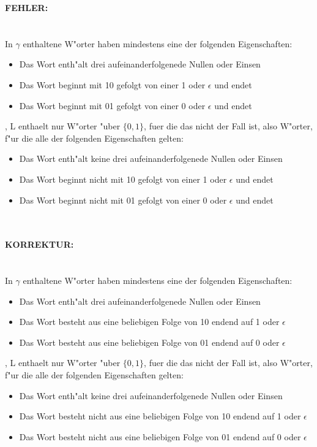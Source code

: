 \documentclass{article}
\newcommand{\gap}{\null\ \\ \\}
\newcommand{\eps}{\epsilon}
\newcommand{\task}[1]{\textbf{#1} \\ \gap}
\newcommand{\error}{\task{FEHLER:}}
\newcommand{\correction}{\task{KORREKTUR:}}
\begin{document}
\error
In $\gamma$ enthaltene W"orter haben mindestens eine der folgenden
Eigenschaften:\\
\begin{itemize}
    \item Das Wort enth"alt drei aufeinanderfolgenede Nullen oder Einsen
    \item Das Wort beginnt mit 10 gefolgt von einer 1 oder $\eps$ und endet
    \item Das Wort beginnt mit 01 gefolgt von einer 0 oder $\eps$ und endet
\end{itemize}
, L enthaelt nur W"orter "uber $\{0, 1\}$, fuer die das nicht der Fall ist,
    also W"orter, f"ur die alle der folgenden Eigenschaften gelten:\\
\begin{itemize}
    \item Das Wort enth"alt keine drei aufeinanderfolgenede Nullen oder Einsen
    \item Das Wort beginnt nicht mit 10 gefolgt von einer 1 oder $\eps$ und 
            endet
    \item Das Wort beginnt nicht mit 01 gefolgt von einer 0 oder $\eps$ und 
            endet
\end{itemize}

\gap
\correction
In $\gamma$ enthaltene W"orter haben mindestens eine der folgenden
Eigenschaften:\\
\begin{itemize}
    \item Das Wort enth"alt drei aufeinanderfolgenede Nullen oder Einsen
    \item Das Wort besteht aus eine beliebigen Folge von 10 endend auf 1 
            oder $\eps$
    \item Das Wort besteht aus eine beliebigen Folge von 01 endend auf 0 
            oder $\eps$
\end{itemize}
, L enthaelt nur W"orter "uber $\{0, 1\}$, fuer die das nicht der Fall ist,
    also W"orter, f"ur die alle der folgenden Eigenschaften gelten:\\
\begin{itemize}
    \item Das Wort enth"alt keine drei aufeinanderfolgenede Nullen oder Einsen
    \item Das Wort besteht nicht aus eine beliebigen Folge von 10 endend auf 1 
            oder $\eps$
    \item Das Wort besteht nicht aus eine beliebigen Folge von 01 endend auf 0 
            oder $\eps$
\end{itemize}
\end{document}
